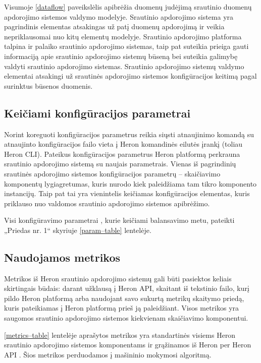 \documentclass{VUMIFPSbakalaurinis}
\begin{document}
Visumoje \ref{dataflow} paveikslėlis apibrėžia duomenų judėjimą srautinio duomenų apdorojimo sistemos valdymo modelyje. Srautinio apdorojimo sistema yra pagrindinis elementas atsakingas už patį duomenų apdorojimą ir veikia nepriklausomai nuo kitų elementų modelyje. Srautinio apdorojimo platforma talpina ir palaiko srautinio apdorojimo sistemas, taip pat suteikia prieiga gauti informaciją apie srautinio apdorojimo sistemų būseną bei suteikia galimybę valdyti srautinio apdorojimo sistemas. Srautinio apdorojimo sistemų valdymo elementai atsakingi už srautinės apdorojimo sistemos konfigūracijos keitimą pagal surinktus būsenos duomenis.

\subsection{Keičiami konfigūracijos parametrai}

Norint koreguoti konfigūracijos parametrus reikia siųsti atnaujinimo komandą su atnaujinto konfigūracijos failo vieta į Heron komandinės eilutės įrankį (toliau Heron CLI). Pateikus konfigūracijos parametrus Heron platformą perkrauna srautinio apdorojimo sistemą su naujais parametrais. 
Vienas iš pagrindinių srautinės apdorojimo sistemos konfigūracijos parametrų – skaičiavimo komponentų lygiagretumas, kuris nurodo kiek paleidžiama tam tikro komponento instancijų. Taip pat tai yra vienintelis keičiamas konfigūracijos elementas, kuris priklauso nuo valdomos srautinio apdorojimo sistemos apibrėžimo.

Visi konfigūravimo parametrai \cite{configDocument}, kurie keičiami balansavimo metu, pateikti „Priedas nr. 1“ skyriuje \ref{param–table} lentelėje.


\subsection{Naudojamos metrikos}
Metrikos iš Heron srautinio apdorojimo sistemų gali būti pasiektos keliais skirtingais būdais: darant užklausą į Heron API, skaitant iš tekstinio failo, kurį pildo Heron platformą arba naudojant savo sukurtą metrikų skaitymo priedą, kuris pateikiamas į Heron platformą prieš ją paleidžiant. Visos metrikos yra saugomos srautinio apdorojimo sistemos kiekvienam skaičiavimo komponentui. 

\ref{metrics–table} lentelėje aprašytos metrikos yra standartinės visiems Heron srautinio apdorojimo sistemos komponentams ir grąžinamos iš Heron per Heron API \cite{heronTracker}. Šios metrikos perduodamos į mašininio mokymosi algoritmą.
\end{document}
